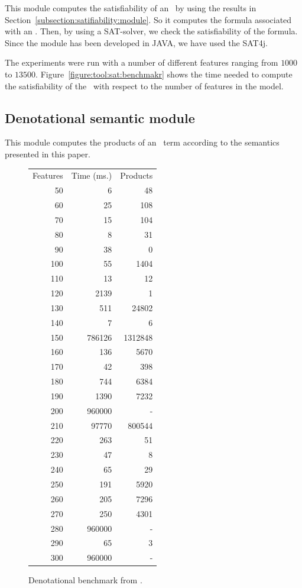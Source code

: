 This module computes the satisfiability of an \SPL\ by
using the results in Section~\ref{subsection:satifiability:module}. So it 
computes the formula associated with an \SPL. Then, by using a SAT-solver,
we check the satisfiability of the formula. Since the module has been developed in JAVA, we have used the SAT4j.

The experiments were run with a number of different features ranging from $1000$ to $13500$. Figure~\ref{figure:tool:sat:benchmakr} shows the
time needed to compute the satisfiability of the 
\SPLs\ with respect to the number of features in the model.

\subsection{Denotational semantic module}
\label{subsection:denotational:semantics}

This module computes the products of an \fodaPA\ term according to the semantics presented in this paper. 


\begin{figure}[t]
	\centering
	\begin{tabular}{rrr}
		Features&       Time (ms.)&    Products\\
		50 & 6 & 48 \\
		60 & 25 & 108 \\
		70 & 15 & 104 \\
		80 & 8 & 31 \\
		90 & 38 & 0 \\
		100 & 55 & 1404 \\
		110 & 13 & 12 \\
		120 & 2139 & 1 \\
		130 & 511 & 24802 \\
		140 & 7 & 6 \\
		150 & 786126 & 1312848 \\
		160 & 136 & 5670 \\
		170 & 42 & 398 \\
		180 & 744 & 6384 \\
		190 & 1390 & 7232 \\
		200 & 960000 & - \\
		210 & 97770 & 800544 \\
		220 & 263 & 51 \\
		230 & 47 & 8 \\
		240 & 65 & 29 \\
		250 & 191 & 5920 \\
		260 & 205 & 7296 \\
		270 & 250 & 4301 \\
		280 & 960000 & - \\
		290 & 65 & 3 \\
		300 & 960000 & - \\
	\end{tabular}
	\caption{Denotational benchmark from \cite{acl13}.\label{figure:tool:den:benchmark}}
\end{figure}

